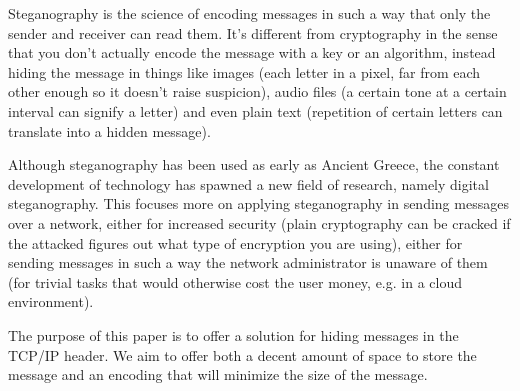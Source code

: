 
Steganography is the science of encoding messages in such a way that only the
sender and receiver can read them. It’s different from cryptography in the
sense that you don’t actually encode the message with a key or an algorithm,
instead hiding the message in things like images (each letter in a pixel, far
from each other enough so it doesn’t raise suspicion), audio files (a certain
tone at a certain interval can signify a letter) and even plain text
(repetition of certain letters can translate into a hidden message).

Although steganography has been used as early as Ancient Greece, the constant
development of technology has spawned a new field of research, namely digital
steganography. This focuses more on applying steganography in sending messages
over a network, either for increased security (plain cryptography can be
cracked if the attacked figures out what type of encryption you are using),
either for sending messages in such a way the network administrator is unaware
of them (for trivial tasks that would otherwise cost the user money, e.g. in a
cloud environment).

The purpose of this paper is to offer a solution for hiding messages in the
TCP/IP header. We aim to offer both a decent amount of space to store the
message and an encoding that will minimize the size of the message.
